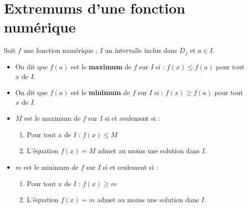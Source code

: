 \section{Extremums d'une fonction numérique }




\begin{Definition}[][]
Soit $f$ une fonction numérique ; $I$ un intervalle inclus dans $D_f$ et $a \in I$.
\begin{itemize}
    \item On dit que $f(a)$ est le \textbf{maximum} de $f$ sur $I$ si : 
    $f(x) \leq f(a)$ pour tout $x$ de $I$.
    \item On dit que $f(a)$ est le \textbf{minimum} de $f$ sur $I$ si : 
    $f(x) \geq f(a)$ pour tout $x$ de $I$.
\end{itemize}
\end{Definition}









\begin{Remarque}[][]
\begin{itemize}
    \item $M$ est le maximum de $f$ sur $I$ si et seulement si :
    \begin{enumerate}
        \item Pour tout $x$ de $I$ : $f(x) \leq M$
        \item L'équation $f(x) = M$ admet au moins une solution dans $I$.
    \end{enumerate}
    \item $m$ est le minimum de $f$ sur $I$ si et seulement si :
    \begin{enumerate}
        \item Pour tout $x$ de $I$ : $f(x) \geq m$
        \item L'équation $f(x) = m$ admet au moins une solution dans $I$.
    \end{enumerate}
\end{itemize}
\end{Remarque}







